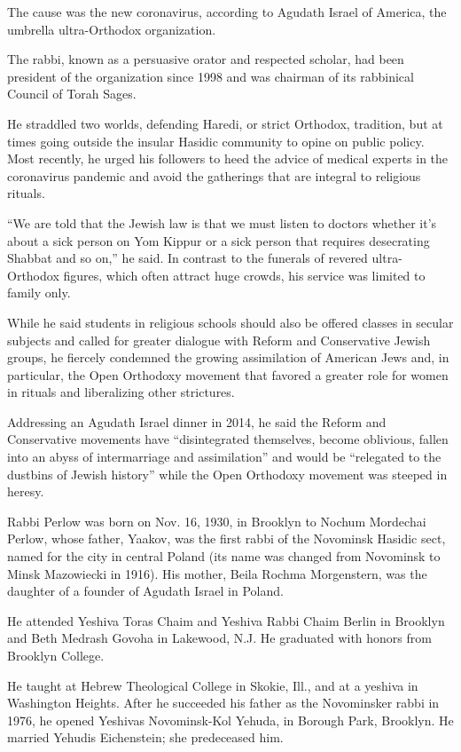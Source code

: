 The cause was the new coronavirus, according to Agudath Israel of
America, the umbrella ultra-Orthodox organization.

The rabbi, known as a persuasive orator and respected scholar, had been
president of the organization since 1998 and was chairman of its
rabbinical Council of Torah Sages.

He straddled two worlds, defending Haredi, or strict Orthodox,
tradition, but at times going outside the insular Hasidic community to
opine on public policy. Most recently, he urged his followers to heed
the advice of medical experts in the coronavirus pandemic and avoid the
gatherings that are integral to religious rituals.

``We are told that the Jewish law is that we must listen to doctors
whether it's about a sick person on Yom Kippur or a sick person that
requires desecrating Shabbat and so on,'' he said. In contrast to the
funerals of revered ultra-Orthodox figures, which often attract huge
crowds, his service was limited to family only.

While he said students in religious schools should also be offered
classes in secular subjects and called for greater dialogue with Reform
and Conservative Jewish groups, he fiercely condemned the growing
assimilation of American Jews and, in particular, the Open Orthodoxy
movement that favored a greater role for women in rituals and
liberalizing other strictures.

Addressing an Agudath Israel dinner in 2014, he said the Reform and
Conservative movements have ``disintegrated themselves, become
oblivious, fallen into an abyss of intermarriage and assimilation'' and
would be ``relegated to the dustbins of Jewish history'' while the Open
Orthodoxy movement was steeped in heresy.

Rabbi Perlow was born on Nov. 16, 1930, in Brooklyn to Nochum Mordechai
Perlow, whose father, Yaakov, was the first rabbi of the Novominsk
Hasidic sect, named for the city in central Poland (its name was changed
from Novominsk to Minsk Mazowiecki in 1916). His mother, Beila Rochma
Morgenstern, was the daughter of a founder of Agudath Israel in Poland.

He attended Yeshiva Toras Chaim and Yeshiva Rabbi Chaim Berlin in
Brooklyn and Beth Medrash Govoha in Lakewood, N.J. He graduated with
honors from Brooklyn College.

He taught at Hebrew Theological College in Skokie, Ill., and at a
yeshiva in Washington Heights. After he succeeded his father as the
Novominsker rabbi in 1976, he opened Yeshivas Novominsk-Kol Yehuda, in
Borough Park, Brooklyn. He married Yehudis Eichenstein; she predeceased
him.


